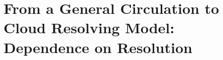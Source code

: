 \documentclass[draft]{agujournal2019}
\begin{document}
{%


\section{From a General Circulation to Cloud Resolving Model: Dependence on Resolution}

}
\end{document}
